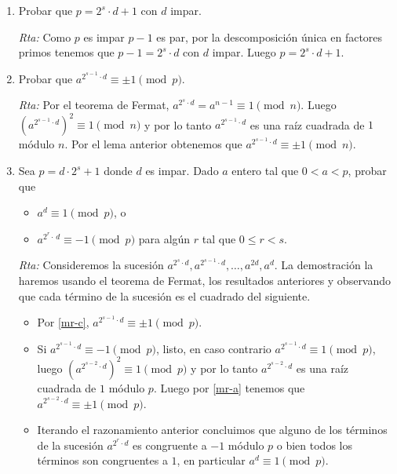 \documentclass[a4paper,12pt,twoside,spanish,reqno]{amsbook}
\numberwithin{equation}{section}
\newcommand{\rta}{\noindent\textit{Rta: }}
\begin{document}
\begin{enumerate}
\begin{enumerate}
    \item Probar que   $p= 2^s \cdot d + 1$ con $d$ impar. 
    
    \rta Como $p$ es impar $p-1$ es par, por la descomposición única en factores primos tenemos que $p-1=2^s \cdot d$ con $d$ impar. Luego $p= 2^s \cdot d + 1$.
    
    \item \label{mr-c} Probar que $a^{2^{s-1} \cdot d} \equiv \pm 1 \pmod{p}$.
    
    \rta Por el teorema de Fermat,  $a^{2^s \cdot d} = a^{n-1} \equiv 1 \pmod{n}$. Luego $(a^{2^{s-1} \cdot d})^2 \equiv 1 \pmod{n}$ y por lo tanto $a^{2^{s-1} \cdot d}$ es una raíz cuadrada de $1$ módulo $n$. Por el lema anterior obtenemos  que  $a^{2^{s-1} \cdot d} \equiv \pm 1 \pmod{n}$.

    \item Sea  $p = d \cdot 2^s + 1$ donde $d$ es impar. Dado $a$ entero tal que $0 < a <p$, probar que 
    \begin{itemize}
        \item $a^{d} \equiv 1 \pmod{p}$, o
        \item $a^{2^r\cdot\, d} \equiv -1 \pmod{p}$  para algún $r$ tal que $0 \le r < s$.
    \end{itemize}
    \rta Consideremos la sucesión $a^{2^s \cdot d}, a^{2^{s-1} \cdot d}, \dots, a^{2d}, a^d$. La demostración la haremos usando el teorema de Fermat,  los resultados anteriores y observando que cada término de la sucesión es el cuadrado del siguiente.
    \begin{itemize}
        \item Por \ref{mr-c},  $a^{2^{s-1} \cdot d} \equiv \pm 1 \pmod{p}$.
        \item Si  $a^{2^{s-1} \cdot d} \equiv - 1 \pmod{p}$, listo,  en caso contrario  $a^{2^{s-1} \cdot d} \equiv 1 \pmod{p}$,  luego $(a^{2^{s-2} \cdot d})^2 \equiv 1 \pmod{p}$ y por lo tanto $a^{2^{s-2} \cdot d}$ es una raíz cuadrada de $1$ módulo $p$. Luego por \ref{mr-a} tenemos que   $a^{2^{s-2} \cdot d} \equiv \pm 1 \pmod{p}$.
        \item Iterando el razonamiento anterior concluimos que alguno de los términos de la sucesión $ a^{2^{r} \cdot d}$  es congruente   a $-1$ módulo $p$ o bien todos los términos son congruentes a $1$,  en particular $a^{d} \equiv 1 \pmod{p}$.
    \end{itemize}
    
\end{enumerate}
    

\end{enumerate}
\end{document}
